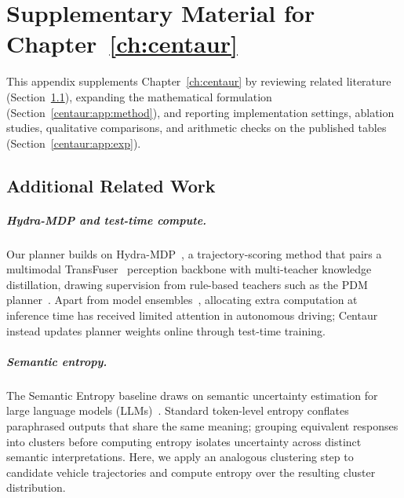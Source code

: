 \chapter{Supplementary Material for Chapter~\ref{ch:centaur}}\label{app:centaur}

This appendix supplements Chapter~\ref{ch:centaur} by reviewing related literature (Section~\ref{centaur:app:related}), expanding the mathematical formulation (Section~\ref{centaur:app:method}), and reporting implementation settings, ablation studies, qualitative comparisons, and arithmetic checks on the published tables (Section~\ref{centaur:app:exp}).

\section{Additional Related Work}\label{centaur:app:related}

\paragraph{Hydra-MDP and test-time compute.} Our planner builds on Hydra-MDP~\cite{li2024hydramdp}, a trajectory-scoring method that pairs a multimodal TransFuser~\cite{chitta2023transfuser} perception backbone with multi-teacher knowledge distillation, drawing supervision from rule-based teachers such as the PDM planner~\cite{dauner2023parting}. Apart from model ensembles~\cite{lakshminarayanan2017simple,li2024perceptionuncertainties}, allocating extra computation at inference time has received limited attention in autonomous driving; Centaur instead updates planner weights online through test-time training.

\paragraph{Semantic entropy.} The Semantic Entropy baseline draws on semantic uncertainty estimation for large language models (LLMs)~\cite{kuhn2023semantic}. Standard token-level entropy conflates paraphrased outputs that share the same meaning; grouping equivalent responses into clusters before computing entropy isolates uncertainty across distinct semantic interpretations. Here, we apply an analogous clustering step to candidate vehicle trajectories and compute entropy over the resulting cluster distribution.

